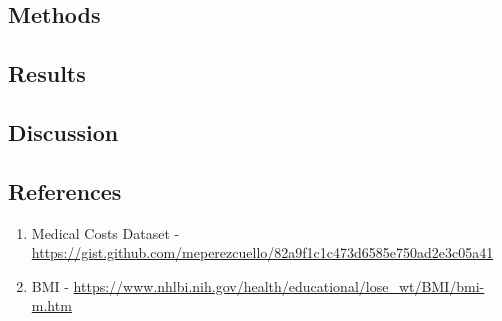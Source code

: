 \documentclass[
]{article}
\providecommand{\tightlist}{%
  \setlength{\itemsep}{0pt}\setlength{\parskip}{0pt}}
\begin{document}
\hypertarget{methods}{%
\subsection{Methods}\label{methods}}

\hypertarget{results}{%
\subsection{Results}\label{results}}

\hypertarget{discussion}{%
\subsection{Discussion}\label{discussion}}

\hypertarget{references}{%
\subsection{References}\label{references}}

\begin{enumerate}
\def\labelenumi{\arabic{enumi}.}
\tightlist
\item
  Medical Costs Dataset -
  \url{https://gist.github.com/meperezcuello/82a9f1c1c473d6585e750ad2e3c05a41}
\item
  BMI -
  \url{https://www.nhlbi.nih.gov/health/educational/lose_wt/BMI/bmi-m.htm}
\end{enumerate}
\end{document}
